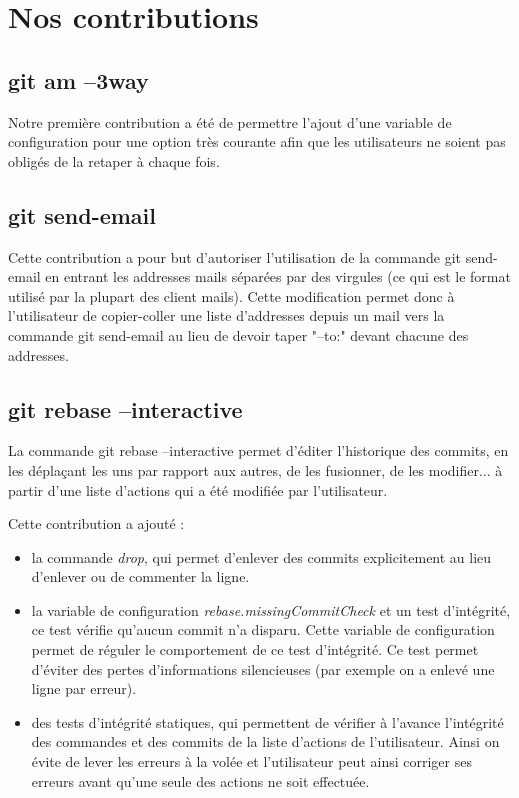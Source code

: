 \documentclass[a4paper, 12pt]{article}
\begin{document}
\section{Nos contributions}

\subsection{git am --3way}

Notre première contribution a été de permettre l'ajout d'une variable de configuration pour une option très courante afin que les utilisateurs ne soient pas obligés de la retaper à chaque fois.

\subsection{git send-email}

Cette contribution a pour but d'autoriser l'utilisation de la commande git send-email en entrant les addresses mails séparées par des virgules (ce qui est le format utilisé par la plupart des client mails). Cette modification permet donc à l'utilisateur de copier-coller une liste d'addresses depuis un mail vers la commande git send-email au lieu de devoir taper "--to:" devant chacune des addresses.

\subsection{git rebase --interactive}

La commande git rebase --interactive permet d'éditer l'historique des commits, en les déplaçant les uns par rapport aux autres, de les fusionner, de les modifier... à partir d'une liste d'actions qui a été modifiée par l'utilisateur.

Cette contribution a ajouté :
\begin{itemize}
\item la commande \textit{drop}, qui permet d'enlever des commits explicitement au lieu d'enlever ou de commenter la ligne.
\item la variable de configuration \textit{rebase.missingCommitCheck} et un test d'intégrité, ce test vérifie qu'aucun commit n'a disparu. Cette variable de configuration permet de réguler le comportement de ce test d'intégrité. Ce test permet d'éviter des pertes d'informations silencieuses (par exemple on a enlevé une ligne par erreur).
\item des tests d'intégrité statiques, qui permettent de vérifier à l'avance l'intégrité des commandes et des commits de la liste d'actions de l'utilisateur. Ainsi on évite de lever les erreurs à la volée et l'utilisateur peut ainsi corriger ses erreurs avant qu'une seule des actions ne soit effectuée.
\end{itemize}
\end{document}

